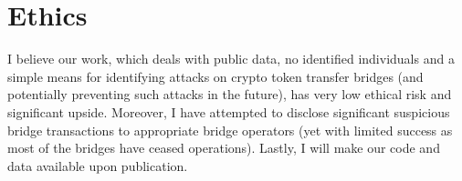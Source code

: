 \section{Ethics}
\label{sec:ethics}

I believe our work, which deals with public data, no identified
individuals and a simple means for identifying attacks on crypto token
transfer bridges (and potentially preventing such attacks in the
future), has very low ethical risk and significant upside. Moreover, I have attempted to disclose significant suspicious bridge
transactions to appropriate bridge operators (yet with limited
success as most of the bridges have ceased operations). Lastly, I will make our code and data available upon publication.
% 






